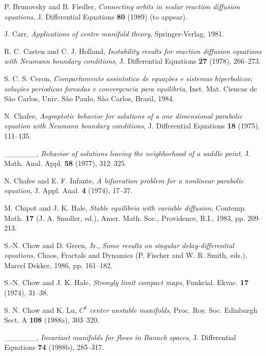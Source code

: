 \documentclass{surv-l}
\theoremstyle{plain}
\theoremstyle{definition}
\numberwithin{equation}{section}
\numberwithin{figure}{chapter}
\begin{document}
\begin{thebibliography}{}
 P. Brunovsky and B. Fiedler, \emph{Connecting orbits in scalar reaction diffusion equations}, J. Differential Equations \textbf{80} (1989) (to appear).

 J. Carr, \emph{Applications of centre manifold theory}, Springer-Verlag, 1981.

 R. C. Casten and C. J. Holland, \emph{Instability results for reaction diffusion equations with Neumann boundary conditions}, J. Differential Equations \textbf{27} (1978), 266--273.

 S. C. S. Ceron, \emph{Compartamento assintotico de equa\c{c}\~{o}es e sistemas hiperbolicos: solu\c{c}\~{o}es periodicas forcadas e convergencia para equilibria}, Inst. Mat. Ciencas de S\~{a}o Carlos, Univ. S\~{a}o Paulo, S\~{a}o Carlos, Brasil, 1984.

 N. Chafee, \emph{Asymptotic behavior for solutions of a one dimensional parabolic equation with Neumann boundary conditions}, J. Differential Equations \textbf{18} (1975), 111--135.

 \_\_\_\_\_\_, \emph{Behavior of solutions leaving the neighborhood of a saddle point}, J. Math. Anal. Appl. \textbf{58} (1977), 312--325.

 N. Chafee and E. F. Infante, \emph{A bifurcation problem for a nonlinear parabolic equation}, J. Appl. Anal. \textbf{4} (1974), 17--37.

 M. Chipot and J. K. Hale, \emph{Stable equilibria with variable diffusion}, Contemp. Math. \textbf{17} (J. A. Smoller, ed.), Amer. Math. Soc., Providence, R.I., 1983, pp. 209--213.

 S.-N. Chow and D. Green, Jr., \emph{Some results on singular delay-differential equations}, Chaos, Fractals and Dynamics (P. Fischer and W. R. Smith, eds.), Marcel Dekker, 1986, pp. 161--182.

 S.-N. Chow and J. K. Hale, \emph{Strongly limit compact maps}, Funkcial. Ekvac. \textbf{17} (1974), 31--38.

 S. N. Chow and K. Lu, $C^{k}$ \emph{center unstable manifolds}, Proc. Roy. Soc. Edinburgh Sect. A \textbf{108} (1988a), 303--320.

 \_\_\_\_\_\_, \emph{Invariant manifolds for flows in Banach spaces}, J. Differential Equations \textbf{74} (1988b), 285--317.


\end{thebibliography}
\end{document}
